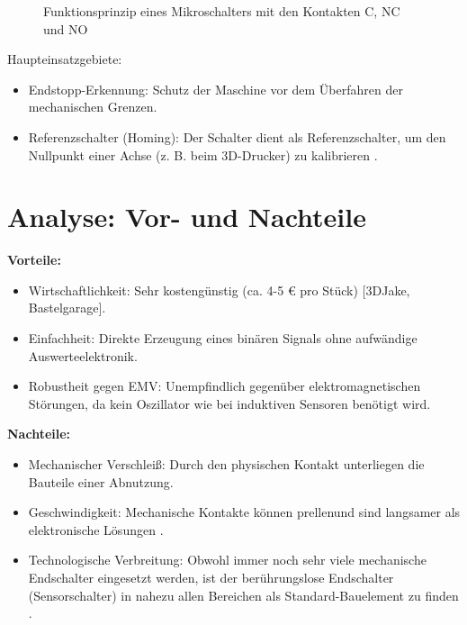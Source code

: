 \begin{figure}[H]
	\centering
	
	\caption{Funktionsprinzip eines Mikroschalters mit den Kontakten C, NC und NO}
	\label{fig:microswitch_principle}
\end{figure}

Haupteinsatzgebiete:

\begin{itemize}
	\item Endstopp-Erkennung: Schutz der Maschine vor dem Überfahren der mechanischen Grenzen.
	\item Referenzschalter (Homing): Der Schalter dient als \glqq Referenzschalter\grqq{}, um den Nullpunkt einer Achse (z. B. beim 3D-Drucker) zu kalibrieren \cite{bastelgarage:2026}.
\end{itemize}

\section{Analyse: Vor- und Nachteile}

\textbf{Vorteile:}

\begin{itemize}
	\item Wirtschaftlichkeit: Sehr kostengünstig (ca. 4-5 € pro Stück) [3DJake, Bastelgarage].
	\item Einfachheit: Direkte Erzeugung eines binären Signals ohne aufwändige Auswerteelektronik.
	\item Robustheit gegen EMV: Unempfindlich gegenüber elektromagnetischen Störungen, da kein Oszillator wie bei induktiven Sensoren benötigt wird.
\end{itemize}

\textbf{Nachteile:}

\begin{itemize}
	\item Mechanischer Verschleiß: Durch den physischen Kontakt unterliegen die Bauteile einer Abnutzung.
	\item Geschwindigkeit: Mechanische Kontakte können \glqq prellen\grqq{}und sind langsamer als elektronische Lösungen \cite[444]{Hering:2012}.
	\item Technologische Verbreitung: Obwohl immer noch sehr viele mechanische Endschalter eingesetzt werden, ist der berührungslose Endschalter (Sensorschalter) in nahezu allen Bereichen als Standard-Bauelement zu finden \cite[435]{Hering:2012}.
\end{itemize}

